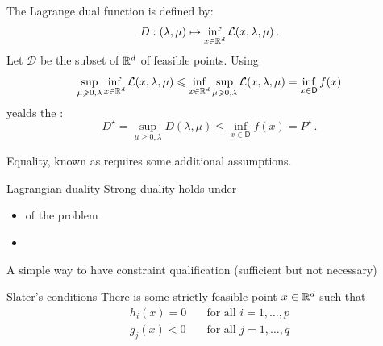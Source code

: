 \documentclass[xcolor={usenames,dvipsnames}]{beamer}
\begin{document}
\begin{frame}
The \alert{Lagrange dual} function is defined by:
$$
D:(\lambda, \mu) \mapsto \inf_{x \in \mathbb{R}^d} \mathcal{L}(x, \lambda, \mu)\,.
$$
Let $\mathcal{D}$ be the subset of $\mathbb{R}^d$ of feasible points. Using
$$
\sup_{\mu\geqslant 0,\lambda}\inf_{x \in \mathbb{R}^d} \mathcal{L}(x,\lambda,\mu) \leqslant \inf_{x \in \mathbb{R}^d} \sup_{\mu\geqslant 0,\lambda}\mathcal{L}(x,\lambda,\mu)=\inf_{x \in \mathsf{D}} f(x) 
$$
yealds the :
$$
D^\star = \sup_{\mu\geq 0,\lambda} D(\lambda, \mu) \leq \inf_{x \in \mathsf{D}} f(x) =P^\star\,.
$$

\vspace{.2cm}

Equality, known as  requires some additional assumptions.
 
\end{frame}


\begin{frame}{Lagrangian duality}
  \alert{Strong duality} holds under 
  \begin{itemize}
  \item {} of the problem 
  \item {} 
  \end{itemize}

  \medskip
  A simple way to have constraint qualification (sufficient but not necessary)
    \begin{block}{Slater's conditions}
    There is some strictly feasible point $x \in \mathbb{R}^d$ such that
    \begin{align*}
      h_i(x) = 0 &\quad \text{for all } i=1, \ldots, p \\
      g_j(x) < 0 &\quad \text{for all } j=1, \ldots, q
    \end{align*}
    \end{block}
\end{frame}
\end{document}
